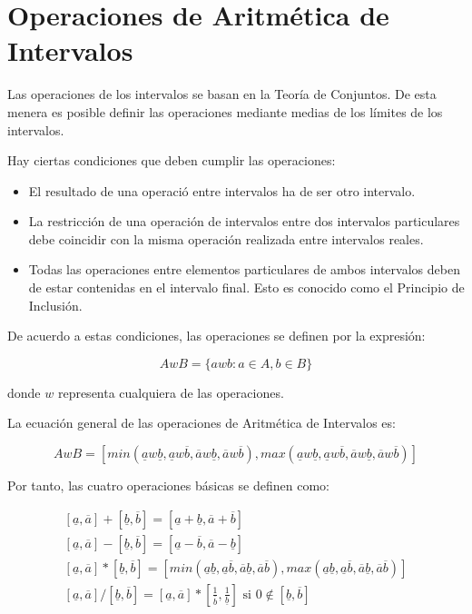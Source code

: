 \section{Operaciones de Aritmética de Intervalos}

Las operaciones de los intervalos se basan en la Teoría de Conjuntos. De esta menera es posible definir las operaciones mediante medias de los límites de los intervalos.
\par Hay ciertas condiciones que deben cumplir las operaciones:

\begin{itemize}
	\item El resultado de una operació entre intervalos ha de ser otro intervalo.
	\item La restricción de una operación de intervalos entre dos intervalos particulares debe coincidir con la misma operación realizada entre intervalos reales.
	\item Todas las operaciones entre elementos particulares de ambos intervalos deben de estar contenidas en el intervalo final. Esto es conocido como el Principio de Inclusión.
\end{itemize}

De acuerdo a estas condiciones, las operaciones se definen por la expresión:

\begin{equation}
AwB = \{ awb : a \in A, b \in B \}
\end{equation}

donde $w$ representa cualquiera de las operaciones.
\par La ecuación general de las operaciones de Aritmética de Intervalos es:

\begin{equation}
AwB = [ min(\underline{a}w\underline{b},\underline{a}w\overline{b},\overline{a}w\underline{b},\overline{a}w\overline{b}), max(\underline{a}w\underline{b},\underline{a}w\overline{b},\overline{a}w\underline{b},\overline{a}w\overline{b}) ]
\nonumber
\end{equation}

Por tanto, las cuatro operaciones básicas se definen como:

\begin{equation}
\begin{split}
[\underline{a},\overline{a}] + [\underline{b},\overline{b}] = [\underline{a} + \underline{b},\overline{a} + \overline{b}] \\
[\underline{a},\overline{a}] - [\underline{b},\overline{b}] = [\underline{a} - \overline{b},\overline{a} - \underline{b}] \\
[\underline{a},\overline{a}] * [\underline{b},\overline{b}] = [min(\underline{a}\underline{b},\underline{a}\overline{b},\overline{a}\underline{b},\overline{a}\overline{b}), max(\underline{a}\underline{b},\underline{a}\overline{b},\overline{a}\underline{b},\overline{a}\overline{b})] \\
[\underline{a},\overline{a}] / [\underline{b},\overline{b}] = [\underline{a},\overline{a}]*[\frac{1}{\overline{b}},\frac{1}{\underline{b}}] \text{ si } 0 \notin [\underline{b},\overline{b}]
\end{split}
\nonumber
\end{equation}

